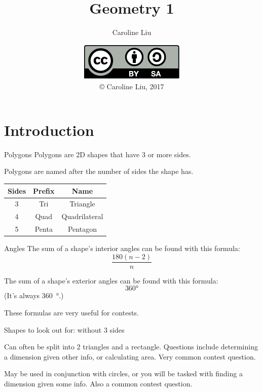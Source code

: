 

\usepackage{siunitx}

\title{Geometry 1}
\author{Caroline Liu}
\date{\includegraphics{../LicenseLogo}\\\copyright{} Caroline Liu, 2017}


	\frame{\titlepage}
	\section{Introduction}
	\begin{namedframe}{Polygons}
		Polygons are 2D shapes that have 3 or more sides.
		\pause

		Polygons are named after the number of sides the shape has.
		\pause

		\begin{center}
			\begin{tabular}{|c|c|c|}
				\hline
				Sides & Prefix & Name\\\hline
				3     & Tri    & Triangle\\
				4     & Quad   & Quadrilateral\\
				5     & Penta  & Pentagon\\\hline
			\end{tabular}
		\end{center}
	\end{namedframe}
	\begin{namedframe}{Angles}
		The sum of a shape's interior angles can be found with this formula:
		\[\frac{180(n-2)}{n}\]
		\pause

		The sum of a shape's exterior angles can be found with this formula:
		\[360\si{\degree}\]
		(It's always \SI{360}{\degree}.)
		\pause

		These formulas are \alert{very} useful for contests.
	\end{namedframe}
	\begin{namedframe}{Shapes to look out for: without 3 sides}
		\begin{description}[<+->]
			\item[Trapezoids] Can often be split into 2 triangles and a rectangle. Questions include determining a dimension given other info, or calculating area. Very common contest question.
			\item[Parallelograms, squares, and rectangles] May be used in conjunction with circles, or you will be tasked with finding a dimension given some info. Also a common contest question.
		\end{description}
	\end{namedframe}
